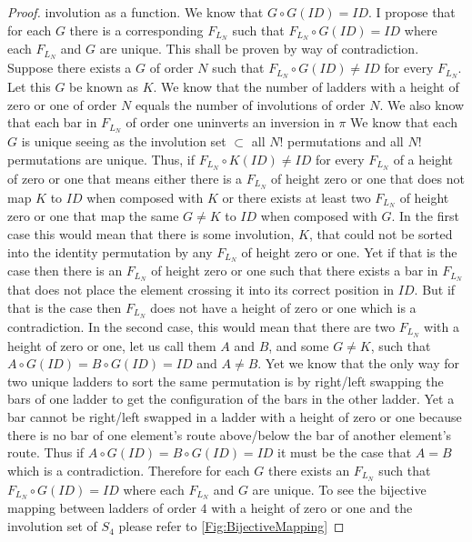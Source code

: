 \begin{proof}
    involution as a function. We know that $G \circ G(ID)=ID$. I propose that for each $G$ there is a corresponding $F_{L_{N}}$
    such that $F_{L_{N}} \circ G(ID) = ID$ where each $F_{L_{N}}$ and $G$ are unique. 
    This shall be proven by way of contradiction. Suppose there exists a $G$ of order $N$ such that  $F_{L_{N}} \circ G(ID) \neq ID$ for every $F_{L_{N}}$.
    Let this $G$ be known as $K$. 
    We know that the number of ladders with a height of zero or one of order $N$ equals the number of involutions of order $N$. We also know that each bar in $F_{L_{N}}$ of order one uninverts an inversion in $\pi$ 
    We know that each $G$ is unique seeing as the involution set $\subset$ all $N!$ permutations and all 
    $N!$ permutations are unique. Thus, if $F_{L_{N}} \circ K(ID) \neq ID$ for every $F_{L_{N}}$ of a height of zero or one that means either there is a 
    $F_{L_{N}}$ of height zero or one that does not map $K$ to $ID$ when composed with $K$ or there exists at least two $F_{L_{N}}$ of height zero or one that map the 
    same $G \neq K$ to $ID$ when composed with $G$. In the first case this would mean that there is some involution, $K$, that could not be sorted into the identity 
    permutation by any $F_{L_{N}}$ of height zero or one. Yet if that is the case then there is an $F_{L_{N}}$ of height zero or one such that there exists 
    a bar in $F_{L_{N}}$ that does not place the element crossing it into its correct position in $ID$. But if that is the case then $F_{L_{N}}$ does not 
    have a height of zero or one which is a contradiction. In the second case, this would mean that there are two $F_{L_{N}}$ with a height of zero or one, 
    let us call them $A$ and $B$, and some $G\neq K$, such that $A\circ G(ID) = B\circ G(ID)=ID$ and $A \neq B$. Yet we know that the only way for two unique ladders 
    to sort the same permutation is by right/left swapping the bars of one ladder to get the configuration of the bars in the other ladder. Yet a bar cannot be 
    right/left swapped in a ladder with a height of zero or one because there is no bar of one element's route above/below the bar of another element's route. Thus if 
    $A\circ G(ID) = B\circ G(ID)=ID$ it must be the case that $A=B$ which is a contradiction. Therefore for each $G$ there exists an $F_{L_{N}}$ such that 
     $F_{L_{N}} \circ G(ID) = ID$ where each $F_{L_{N}}$ and $G$ are unique. To see the bijective mapping 
     between ladders of order $4$ with a height of zero or one and the involution set of $S_{4}$ please refer to \ref{Fig:BijectiveMapping}\pagebreak
\end{proof}
